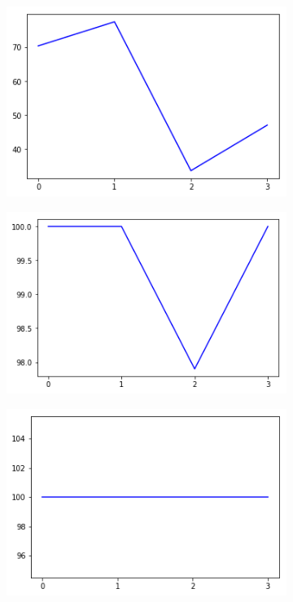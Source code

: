 \begin{figure}[h!]
  \begin{subfigure}[b]{0.3\linewidth}
    \includegraphics[width=\linewidth]{images/subst2/ef0_percent.png}
    \caption{}
  \end{subfigure}
  \begin{subfigure}[b]{0.3\linewidth}
    \includegraphics[width=\linewidth]{images/subst2/ef1_percent.png}
    \caption{}
  \end{subfigure}
  \begin{subfigure}[b]{0.3\linewidth}
    \includegraphics[width=\linewidth]{images/subst2/ef2_percent.png}

\end{subfigure}
\end{figure}
